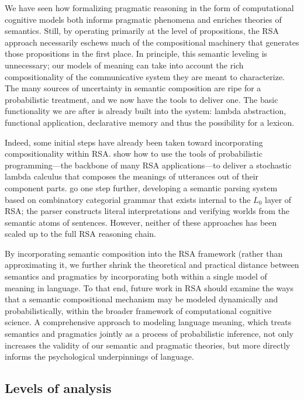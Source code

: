 \documentclass{sp}
\begin{document}
We have seen how formalizing pragmatic reasoning in the form of computational cognitive models both informs pragmatic phenomena and enriches theories of semantics. Still, by operating primarily at the level of propositions, the RSA approach necessarily eschews much of the compositional machinery that generates those propositions in the first place. In principle, this semantic leveling is unnecessary; our models of meaning can take into account the rich compositionality of the communicative system they are meant to characterize. The many sources of uncertainty in semantic composition are ripe for a probabilistic treatment, and we now have the tools to deliver one. The basic functionality we are after is already built into the system: lambda abstraction, functional application, declarative memory and thus the possibility for a lexicon.

Indeed, some initial steps have already been taken toward incorporating compositionality within RSA. \cite{goodmanlassiter2015handbook} show how to use the tools of probabilistic programming---the backbone of many RSA applications---to deliver a stochastic lambda calculus that composes the meanings of utterances out of their component parts. \cite{goodmanstuhlmuller2014} go one step further, developing a semantic parsing system based on combinatory categorial grammar that exists internal to the $L_0$ layer of RSA; the parser constructs literal interpretations and verifying worlds from the semantic atoms of sentences. However, neither of these approaches has been scaled up to the full RSA reasoning chain.

By incorporating semantic composition into the RSA framework (rather than approximating it, we further shrink the theoretical and practical distance between semantics and pragmatics by incorporating both within a single model of meaning in language. To that end, future work in RSA should examine the ways that a semantic compositional mechanism may be modeled dynamically and probabilistically, within the broader framework of computational cognitive science. A comprehensive approach to modeling language meaning, which treats semantics and pragmatics jointly as a process of probabilistic inference, not only increases the validity of our semantic and pragmatic theories, but more directly informs the psychological underpinnings of language.

\subsection{Levels of analysis}
\end{document}
